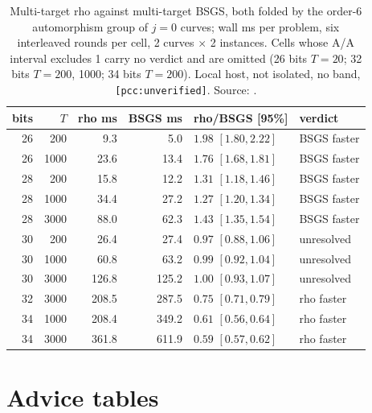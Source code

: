 \begin{table}[t]
\centering\small
\begin{tabular}{@{}rrrrll@{}}
\toprule
bits & $T$ & rho ms & BSGS ms & rho/BSGS [95\%] & verdict \\
\midrule
26 & 200 & 9.3 & 5.0 & $1.98$ $[1.80,2.22]$ & BSGS faster \\
26 & 1000 & 23.6 & 13.4 & $1.76$ $[1.68,1.81]$ & BSGS faster \\
28 & 200 & 15.8 & 12.2 & $1.31$ $[1.18,1.46]$ & BSGS faster \\
28 & 1000 & 34.4 & 27.2 & $1.27$ $[1.20,1.34]$ & BSGS faster \\
28 & 3000 & 88.0 & 62.3 & $1.43$ $[1.35,1.54]$ & BSGS faster \\
30 & 200 & 26.4 & 27.4 & $0.97$ $[0.88,1.06]$ & unresolved \\
30 & 1000 & 60.8 & 63.2 & $0.99$ $[0.92,1.04]$ & unresolved \\
30 & 3000 & 126.8 & 125.2 & $1.00$ $[0.93,1.07]$ & unresolved \\
32 & 3000 & 208.5 & 287.5 & $0.75$ $[0.71,0.79]$ & rho faster \\
34 & 1000 & 208.4 & 349.2 & $0.61$ $[0.56,0.64]$ & rho faster \\
34 & 3000 & 361.8 & 611.9 & $0.59$ $[0.57,0.62]$ & rho faster \\
\bottomrule
\end{tabular}
\caption[]{Multi-target rho against multi-target BSGS, both folded by the
order-6 automorphism group of $j=0$ curves; wall ms per problem, six
interleaved rounds per cell, 2 curves $\times$ 2 instances. Cells whose A/A
interval excludes 1 carry no verdict and are omitted (26 bits $T=20$; 32
bits $T=200$, 1000; 34 bits $T=200$). Local host, not isolated, no band,
\texttt{[pcc:unverified]}. Source:
.}
\label{tab:rv-j0-bsgs}
\end{table}

\section{Advice tables}\label{sec:rv-advice}

